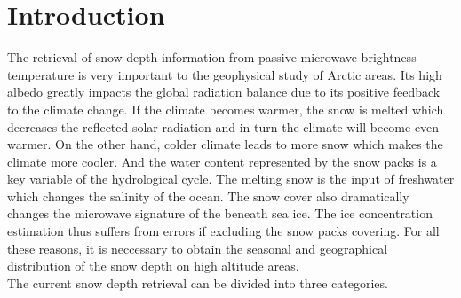 
\chapter{Introduction}
\label{ch_intro}

The retrieval of snow depth information from passive microwave brightness temperature is very important to the geophysical study of Arctic areas. Its high albedo greatly impacts the global radiation balance due to its positive feedback to the climate change. If the climate becomes warmer, the snow is melted which decreases the reflected solar radiation and in turn the climate will become even warmer. On the other hand, colder climate leads to more snow which makes the climate more cooler. And the water content represented by the snow packs is a key variable of the hydrological cycle. The melting snow is the input of freshwater which changes the salinity of the ocean. The snow cover also dramatically changes the microwave signature of the beneath sea ice. The ice concentration estimation thus suffers from errors if excluding the snow packs covering. For all these reasons, it is neccessary to obtain the seasonal and geographical distribution of the snow depth on high altitude areas. \\
The current snow depth retrieval can be divided into three categories. 
